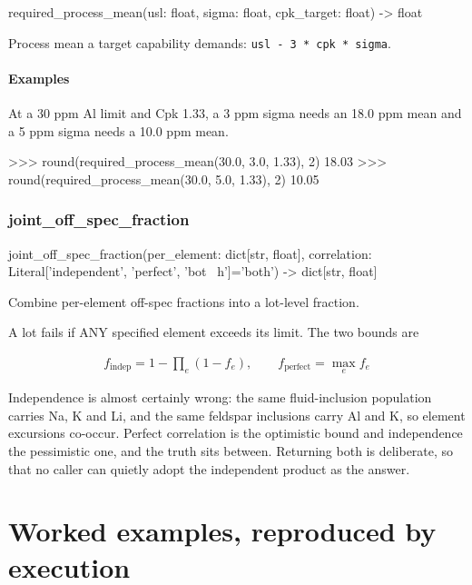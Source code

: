 \documentclass[10pt,a4paper,twoside]{report}
\begin{document}
\begin{verbatimsmall}
required_process_mean(usl: float, sigma: float, cpk_target: float) -> float
\end{verbatimsmall}

Process mean a target capability demands: \texttt{usl - 3 * cpk * sigma}.

\paragraph*{Examples}

At a 30 ppm Al limit and Cpk 1.33, a 3 ppm sigma needs an 18.0 ppm mean and a 5 ppm sigma needs a 10.0 ppm mean.

\begin{doctestblock}
>>> round(required_process_mean(30.0, 3.0, 1.33), 2)
18.03
>>> round(required_process_mean(30.0, 5.0, 1.33), 2)
10.05
\end{doctestblock}

\subsubsection*{joint\_off\_spec\_fraction}

\begin{verbatimsmall}
joint_off_spec_fraction(per_element: dict[str, float], correlation: Literal['independent', 'perfect', 'bot
    \ h']='both') -> dict[str, float]
\end{verbatimsmall}

Combine per-element off-spec fractions into a lot-level fraction.

A lot fails if ANY specified element exceeds its limit. The two bounds are

\begin{equation*}
\begin{gathered}
f_{\mathrm{indep}} = 1 - \prod_e (1 - f_e), \qquad f_{\mathrm{perfect}} = \max_e f_e
\end{gathered}
\end{equation*}

Independence is almost certainly wrong: the same fluid-inclusion population carries Na, K and Li, and the same feldspar inclusions carry Al and K, so element excursions co-occur. Perfect correlation is the optimistic bound and independence the pessimistic one, and the truth sits between. Returning both is deliberate, so that no caller can quietly adopt the independent product as the answer.

\section{Worked examples, reproduced by execution}
\end{document}
